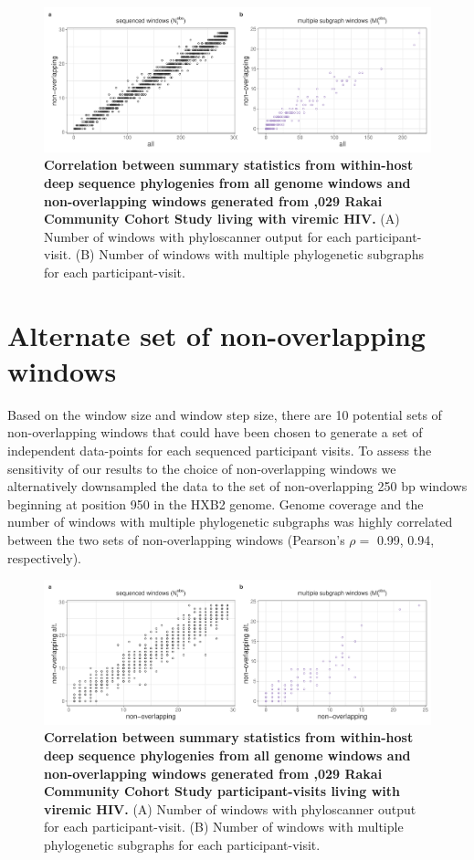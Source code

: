 \documentclass[10pt,letterpaper]{article}
\begin{document}
\begin{figure}[!ht]
 \includegraphics[width=1\textwidth]{../../figures/all_uniq_corr.pdf}
\caption{{\bf Correlation between summary statistics from within-host deep sequence phylogenies from all genome windows and non-overlapping windows generated from ,029 Rakai Community Cohort Study living with viremic HIV.} (A) Number of windows with phyloscanner output for each participant-visit. (B) Number of windows with multiple phylogenetic subgraphs for each participant-visit.}
\label{all_uniq_corr}
\end{figure}


\section{Alternate set of non-overlapping windows}
Based on the window size and window step size, there are 10 potential sets of non-overlapping windows that could have been chosen to generate a set of independent data-points for each sequenced participant visits. To assess the sensitivity of our results to the choice of non-overlapping windows we alternatively downsampled the data to the set of non-overlapping 250 bp windows beginning at position 950 in the HXB2 genome. Genome coverage and the number of windows with multiple phylogenetic subgraphs was highly correlated between the two sets of non-overlapping windows (Pearson's $\rho=$ 0.99, 0.94, respectively).

\begin{figure}[!ht]
 \includegraphics[width=1\textwidth]{../../figures/uniq_uniq_alt_corr.pdf}
\caption{{\bf Correlation between summary statistics from within-host deep sequence phylogenies from all genome windows and non-overlapping windows generated from ,029 Rakai Community Cohort Study participant-visits living with viremic HIV.} (A) Number of windows with phyloscanner output for each participant-visit. (B) Number of windows with multiple phylogenetic subgraphs for each participant-visit.}
\label{uniq_uniq_alt_corr}
\end{figure}
\end{document}
